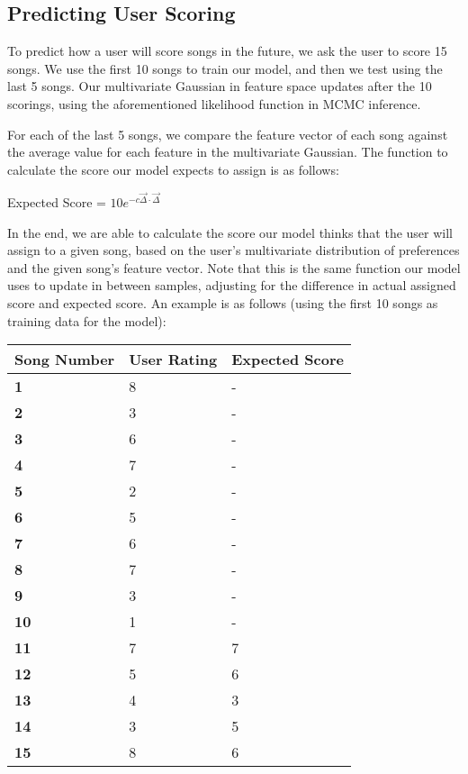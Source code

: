 \documentclass{amsart}
\theoremstyle{plain}
\theoremstyle{definition}
\begin{document}
  	\subsection{Predicting User Scoring}
  	
  	To predict how a user will score songs in the future, we ask the user to score 15 songs. We use the first 10 songs to train our model, and then we test using the last 5 songs. Our multivariate Gaussian in feature space updates after the 10 scorings, using the aforementioned likelihood function in MCMC inference.
  	
  	For each of the last 5 songs, we compare the feature vector of each song against the average value for each feature in the multivariate Gaussian. The function to calculate the score our model expects to assign is as follows:
  	
  	\begin{center}
  		Expected Score = $10e^{-c\vec{\Delta} \cdot \vec{\Delta}}$
  	\end{center}
  
  	In the end, we are able to calculate the score our model thinks that the user will assign to a given song, based on the user's multivariate distribution of preferences and the given song's feature vector. Note that this is the same function our model uses to update in between samples, adjusting for the difference in actual assigned score and expected score. An example is as follows (using the first 10 songs as training data for the model): \\
  	
  	\begin{center}
  		\begin{tabular}{ | m{8em} | m{8em}| m{8em} | } 
  			\hline
  			\textbf{Song Number} & \textbf{User Rating} & \textbf{Expected Score} \\ 
  			\hline
  			\textbf{1} & 8 & - \\ 
  			\hline
  			\textbf{2} & 3 & - \\ 
  			\hline
  			\textbf{3} & 6 & - \\ 
  			\hline
  			\textbf{4} & 7 & - \\ 
  			\hline
  			\textbf{5} & 2 & - \\ 
  			\hline
  			\textbf{6} & 5 & - \\ 
  			\hline
  			\textbf{7} & 6 & - \\ 
  			\hline
  			\textbf{8} & 7 & - \\ 
  			\hline
  			\textbf{9} & 3 & - \\ 
  			\hline
  			\textbf{10} & 1 & - \\ 
  			\hline
  			\textbf{11} & 7 & 7 \\ 
  			\hline
  			\textbf{12} & 5 & 6 \\ 
  			\hline
  			\textbf{13} & 4 & 3 \\ 
  			\hline
  			\textbf{14} & 3 & 5 \\ 
  			\hline
  			\textbf{15} & 8 & 6 \\ 
  			\hline
  		\end{tabular}
  	\end{center} \
  	
\end{document}
